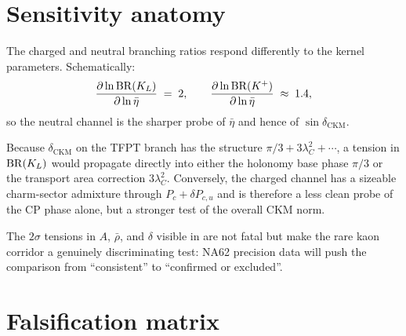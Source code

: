 \section{Sensitivity anatomy}
\label{sec:sensitivity}

The charged and neutral branching ratios respond differently to the kernel
parameters. Schematically:
\begin{equation}
\label{eq:sensitivity}
\frac{\partial\ln\mathrm{BR}(K_L)}{\partial\ln\bar\eta}\;=\;2,
\qquad
\frac{\partial\ln\mathrm{BR}(K^+)}{\partial\ln\bar\eta}\;\approx\;1.4,
\end{equation}
so the neutral channel is the sharper probe of $\bar\eta$ and hence of
$\sin\delta_{\mathrm{CKM}}$.

Because $\delta_{\mathrm{CKM}}$ on the TFPT branch has the structure
$\pi/3+3\lambda_C^2+\cdots$, a tension in $\mathrm{BR}(K_L)$ would
propagate directly into either the holonomy base phase $\pi/3$
or the transport area correction $3\lambda_C^2$.
Conversely, the charged channel has a sizeable charm-sector
admixture through $P_c+\delta P_{c,u}$ and is therefore a less clean
probe of the CP phase alone, but a stronger test of the overall CKM norm.

The $2\sigma$ tensions in $A$, $\bar\rho$, and $\delta$ visible in
 are not fatal but make the rare kaon corridor a
genuinely discriminating test: NA62 precision data will push the comparison
from ``consistent'' to ``confirmed or excluded''.


\section{Falsification matrix}
\label{sec:falsification}

